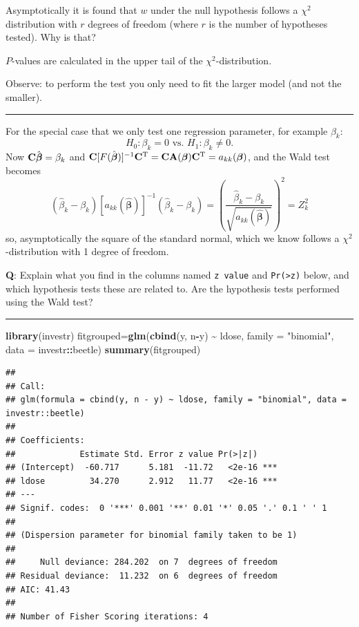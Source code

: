 \documentclass[
]{article}
\newenvironment{Shaded}{\begin{snugshade}}{\end{snugshade}}
\newcommand{\AttributeTok}[1]{\textcolor[rgb]{0.13,0.29,0.53}{#1}}
\newcommand{\FunctionTok}[1]{\textcolor[rgb]{0.13,0.29,0.53}{\textbf{#1}}}
\newcommand{\NormalTok}[1]{#1}
\newcommand{\OtherTok}[1]{\textcolor[rgb]{0.56,0.35,0.01}{#1}}
\newcommand{\SpecialCharTok}[1]{\textcolor[rgb]{0.81,0.36,0.00}{\textbf{#1}}}
\newcommand{\StringTok}[1]{\textcolor[rgb]{0.31,0.60,0.02}{#1}}
\begin{document}
Asymptotically it is found that \(w\) under the null hypothesis follows
a \(\chi^2\) distribution with \(r\) degrees of freedom (where \(r\) is
the number of hypotheses tested). Why is that?

\(P\)-values are calculated in the upper tail of the
\(\chi^2\)-distribution.

Observe: to perform the test you only need to fit the larger model (and
not the smaller).

\begin{center}\rule{0.5\linewidth}{0.5pt}\end{center}

For the special case that we only test one regression parameter, for
example \(\beta_k\):
\[ H_0: \beta_k=0 \text{ vs. } H_1: \beta_k\neq 0.\] Now
\({\bf C}\hat{\boldsymbol{\beta}}=\beta_k\) and
\({\bf C}[F(\hat{\boldsymbol{\beta}})]^{-1}{\bf C}^{\text T}={\bf C}{\bf A}(\boldsymbol{\beta}){\bf C}^{\text T}=a_{kk}(\boldsymbol{\beta})\),
and the Wald test becomes
\[ (\hat{\beta}_k-\beta_k)[a_{kk}(\hat{\boldsymbol{\beta}})]^{-1}(\hat{\beta}_k-\beta_k)=\left(\frac{\hat{\beta}_k-\beta_k}{\sqrt{a_{kk}(\hat{\boldsymbol{\beta}})}}\right)^2=Z_k^2\]
so, asymptotically the square of the standard normal, which we know
follows a \(\chi^2\)-distribution with 1 degree of freedom.

\textbf{Q}: Explain what you find in the columns named \texttt{z\ value}
and \texttt{Pr(\textgreater{}\textbar{}z\textbar{})} below, and which
hypothesis tests these are related to. Are the hypothesis tests
performed using the Wald test?

\begin{center}\rule{0.5\linewidth}{0.5pt}\end{center}

\begin{Shaded}
\begin{Highlighting}[]
\FunctionTok{library}\NormalTok{(investr)}
\NormalTok{fitgrouped}\OtherTok{=}\FunctionTok{glm}\NormalTok{(}\FunctionTok{cbind}\NormalTok{(y, n}\SpecialCharTok{{-}}\NormalTok{y) }\SpecialCharTok{\textasciitilde{}}\NormalTok{ ldose, }\AttributeTok{family =} \StringTok{"binomial"}\NormalTok{, }\AttributeTok{data =}\NormalTok{ investr}\SpecialCharTok{::}\NormalTok{beetle) }
\FunctionTok{summary}\NormalTok{(fitgrouped)}
\end{Highlighting}
\end{Shaded}

\begin{verbatim}
## 
## Call:
## glm(formula = cbind(y, n - y) ~ ldose, family = "binomial", data = investr::beetle)
## 
## Coefficients:
##             Estimate Std. Error z value Pr(>|z|)    
## (Intercept)  -60.717      5.181  -11.72   <2e-16 ***
## ldose         34.270      2.912   11.77   <2e-16 ***
## ---
## Signif. codes:  0 '***' 0.001 '**' 0.01 '*' 0.05 '.' 0.1 ' ' 1
## 
## (Dispersion parameter for binomial family taken to be 1)
## 
##     Null deviance: 284.202  on 7  degrees of freedom
## Residual deviance:  11.232  on 6  degrees of freedom
## AIC: 41.43
## 
## Number of Fisher Scoring iterations: 4
\end{verbatim}
\end{document}

